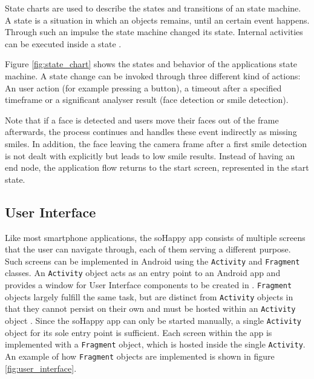 State charts are used to describe the states and transitions of an state machine. A state is a situation in which an objects remains, until an certain event happens. Through such an impulse the state machine changed its state. Internal activities can be executed inside a state \cite{Modeling_with_UML}.

Figure \ref{fig:state_chart} shows the states and behavior of the applications state machine.
A state change can be invoked through three different kind of actions: An user action (for example pressing a button), a timeout after a specified timeframe or a significant analyser result (face detection or smile detection).

Note that if a face is detected and users move their faces out of the frame afterwards, the process continues and handles these event indirectly as missing smiles.
In addition, the face leaving the camera frame after a first smile detection is not dealt with explicitly but leads to low smile results.
Instead of having an end node, the application flow returns to the start screen, represented in the start state.

\subsection{User Interface} \label{sec:user_interface}
Like most smartphone applications, the soHappy app consists of multiple screens that the user can navigate through, each of them serving a different purpose. Such screens can be implemented in Android using the \texttt{Activity} and \texttt{Fragment} classes. An \texttt{Activity} object acts as an entry point to an Android app and provides a window for User Interface components to be created in \cite{intro_to_activities}. \texttt{Fragment} objects largely fulfill the same task, but are distinct from \texttt{Activity} objects in that they cannot persist on their own and must be hosted within an \texttt{Activity} object \cite{intro_to_fragments}. Since the soHappy app can only be started manually, a single \texttt{Activity} object for its sole entry point is sufficient. Each screen within the app is implemented with a \texttt{Fragment} object, which is hosted inside the single \texttt{Activity}. An example of how \texttt{Fragment} objects are implemented is shown in figure \ref{fig:user_interface}.

